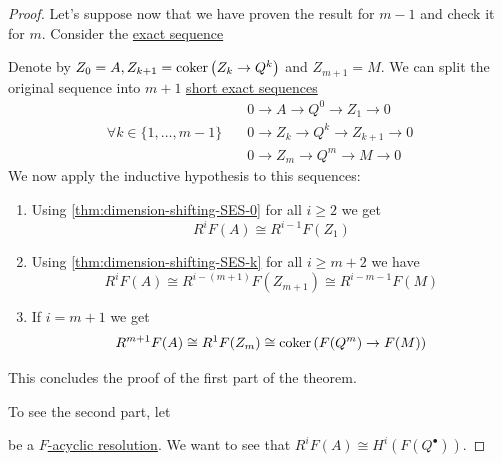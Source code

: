 \documentclass[../../../main]{subfiles}
\begin{document}
\begin{proof}
  Let's suppose now that we have proven the result for \(m-1\) and check it for \(m\).
  Consider the \hyperref[def:short-exact-sequence]{exact sequence}
  \begin{center}
  \end{center}
  Denote by \(Z_{0} = A, Z_{k+1} = \operatorname*{coker} \left( Z_{k} \to Q^{k} \right)\) and \(Z_{m+1} = M\).
  We can split the original sequence into \(m+1\) \hyperref[def:short-exact-sequence]{short exact sequences}
  \begin{align}
    &0 \to A \to Q^{0} \to Z_{1} \to 0 \label{thm:dimension-shifting-SES-0} \\
    \forall k \in \{1, \ldots, m-1\} \quad & 0 \to Z_{k} \to Q^{k} \to Z_{k+1} \to 0 \label{thm:dimension-shifting-SES-k} \\
    &0 \to Z_{m} \to Q^{m} \to M \to 0 \label{thm:dimension-shifting-SES-m}
  \end{align}
  We now apply the inductive hypothesis to this sequences:
  \begin{enumerate}
    \item Using \eqref{thm:dimension-shifting-SES-0} for all \(i \geq 2\) we get
          \begin{equation*}
            R^{i}F(A) \cong R^{i-1}F(Z_{1})
          \end{equation*}
    \item Using \eqref{thm:dimension-shifting-SES-k} for all \(i \geq m + 2\) we have
          \begin{equation*}
            R^{i}F(A) \cong R^{i-(m+1)}F(Z_{m+1}) \cong R^{i-m-1}F(M)
          \end{equation*}
    \item If \(i = m+1\) we get
          \begin{align*}
            R^{m+1}F(A) \cong R^{1}F(Z_{m}) \cong \operatorname*{coker} \left( F(Q^{m}) \to F(M) \right)
          \end{align*}
  \end{enumerate}
  This concludes the proof of the first part of the theorem.

  To see the second part, let
  \begin{center}
  \end{center}
  be a \hyperref[def:acyclic-object]{\(F\)-acyclic resolution}. We want to see that \(R^{i}F(A) \cong H^{i}(F(Q^{\bullet}))\).


\end{proof}
\end{document}

